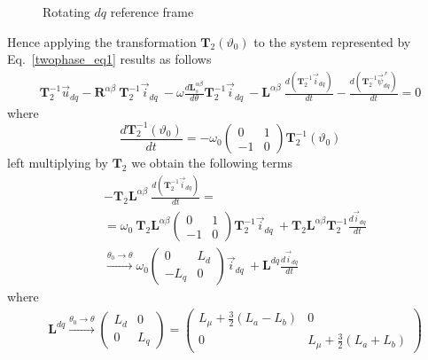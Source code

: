 \documentclass[11pt,a4paper]{article}
\numberwithin{equation}{section}
\theoremstyle{it}
\theoremstyle{definition}
\begin{document}
\begin{onehalfspace}
\begin{figure}[H]
	\captionsetup{width=0.5\textwidth, font=small} 
	\caption	{Rotating $dq$ reference frame}
	\label{dq_ref_frame}
\end{figure}
Hence applying the transformation ${\mathbf{T}}_2(\vartheta_0)$ to the system represented by Eq.~\eqref{twophase_eq1} results as follows
\begin{equation*}
	\begin{aligned}
		\mathbf{T}_2^{-1}\vec{u}_{dq}-\mathbf{R}^{\alpha\beta}\ \mathbf{T}_2^{-1}\vec{i}_{dq}\ -\omega\frac{d\mathbf{L}_s^{\alpha\beta}}{d\theta}\mathbf{T}_2^{-1}\vec{i}_{dq}\ -\mathbf{L}^{\alpha\beta}\ \frac{d\left( \mathbf{T}_2^{-1}\vec{i}_{dq}\right) }{dt}-\frac{d\left( \mathbf{T}_2^{-1}\vec{\psi}_{dq}^{\,r}\right) }{dt} = 0
	\end{aligned} 
\end{equation*}
where
\begin{equation}
	\frac{d\mathbf{T}_2^{-1}(\vartheta_0)}{dt}= -\omega_0\begin{pmatrix} 0 & 1\\ -1 & 0 \end{pmatrix}\mathbf{T}_2^{-1}(\vartheta_0)
\end{equation}
left multiplying by $\mathbf{T}_2$ we obtain the following terms
\begin{equation}
	\begin{aligned}
		&-\mathbf{T}_2\mathbf{L}^{\alpha\beta}\ \frac{d\left( \mathbf{T}_2^{-1}\vec{i}_{dq}\right) }{dt} = \\[6pt]
		&=\omega_0\ \mathbf{T}_2\mathbf{L}^{\alpha\beta}\begin{pmatrix} 0 & 1\\ -1 & 0 \end{pmatrix}\mathbf{T}_2^{-1}\vec{i}_{dq}\ + \mathbf{T}_2\mathbf{L}^{\alpha\beta}\mathbf{T}_2^{-1}\frac{d\vec{i}_{dq}}{dt}  \\[6pt]
		&\xrightarrow{\theta_0\rightarrow\theta} \omega_0\begin{pmatrix} 0 & L_d\\ -L_q & 0 \end{pmatrix}\vec{i}_{dq}\ + \mathbf{L}^{dq}\frac{d\vec{i}_{dq}}{dt}
	\end{aligned}
\end{equation}
where 
\begin{equation}
	\begin{aligned}
		&\mathbf{L}^{dq} \xrightarrow{\theta_0\rightarrow\theta} \begin{pmatrix} L_d & 0\\ 0 & L_q \end{pmatrix} = \begin{pmatrix} L_{\mu}+\frac{3}{2}(L_a-L_b) & 0\\ 0 & L_{\mu}+\frac{3}{2}(L_a+L_b) \end{pmatrix}

\end{aligned}
\end{equation}
\end{onehalfspace}
\end{document}
